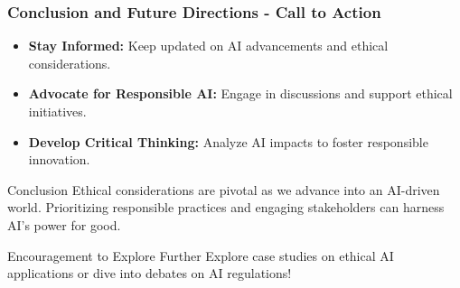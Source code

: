\documentclass{beamer}
\begin{document}
\begin{frame}[fragile]
    \frametitle{Conclusion and Future Directions - Call to Action}
    \begin{itemize}
        \item \textbf{Stay Informed:} Keep updated on AI advancements and ethical considerations.
        \item \textbf{Advocate for Responsible AI:} Engage in discussions and support ethical initiatives.
        \item \textbf{Develop Critical Thinking:} Analyze AI impacts to foster responsible innovation.
    \end{itemize}

    \begin{block}{Conclusion}
        Ethical considerations are pivotal as we advance into an AI-driven world. 
        Prioritizing responsible practices and engaging stakeholders can harness AI's power for good.
    \end{block}
    
    \begin{block}{Encouragement to Explore Further}
        Explore case studies on ethical AI applications or dive into debates on AI regulations!
    \end{block}
\end{frame}
\end{document}
